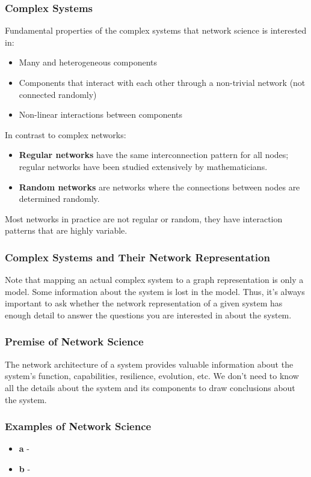 \documentclass[11pt]{scrartcl} %
\begin{document}
\subsubsection{Complex Systems}
Fundamental properties of the complex systems that network science is interested in:
\begin{itemize}
	\item Many and heterogeneous components
	\item Components that interact with each other through a non-trivial network (not connected randomly)
	\item Non-linear interactions between components
\end{itemize}

In contrast to complex networks:
\begin{itemize}
	\item \textbf{Regular networks} have the same interconnection pattern for all nodes; regular networks have been studied extensively by mathematicians.
	\item \textbf{Random networks} are networks where the connections between nodes are determined randomly.
\end{itemize}

Most networks in practice are not regular or random, they have interaction patterns that are highly variable.

\subsubsection{Complex Systems and Their Network Representation}
Note that mapping an actual complex system to a graph representation is only a model. Some information about the system is lost in the model. Thus, it's always important to ask whether the network representation of a given system has enough detail to answer the questions you are interested in about the system.

\subsubsection{Premise of Network Science}
The network architecture of a system provides valuable information about the system's function, capabilities, resilience, evolution, etc. We don't need to know all the details about the system and its components to draw conclusions about the system.

\subsubsection{Examples of Network Science}
\begin{itemize}
	\item \textbf{a} -
	\item \textbf{b} -
\end{itemize}
\end{document}
